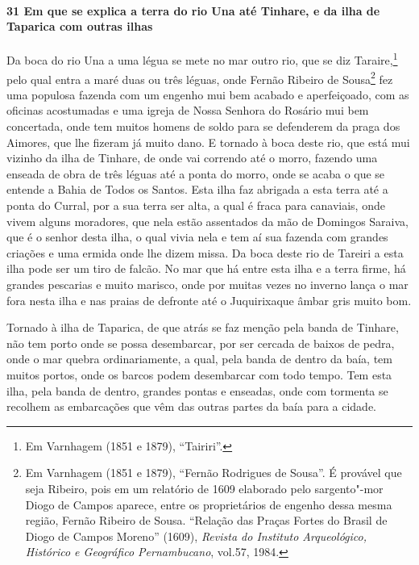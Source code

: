 \begin{linenumbers}
\paragraph{31 Em que se explica a terra do rio Una até Tinhare, e da ilha de Taparica com
outras ilhas}\quad
Da boca do rio Una a uma légua se mete no mar outro rio, que se diz Taraire,\footnote{ Em
Varnhagem (1851 e 1879), ``Tairiri''.} pelo qual entra a maré duas ou três léguas, onde
Fernão Ribeiro de Sousa\footnote{ Em Varnhagem (1851 e 1879), ``Fernão Rodrigues de
Sousa''. É provável que seja Ribeiro, pois em um relatório de 1609 elaborado pelo
sargento"-mor Diogo de Campos aparece, entre os proprietários de engenho dessa mesma
região, Fernão Ribeiro de Sousa. “Relação das Praças Fortes do Brasil de Diogo de Campos
Moreno” (1609), \textit{Revista do Instituto Arqueológico, Histórico e Geográfico
Pernambucano}, vol.57, 1984.} fez uma populosa fazenda com um engenho mui bem acabado e
aperfeiçoado, com as oficinas acostumadas e uma igreja de Nossa Senhora do Rosário mui bem
concertada, onde tem muitos homens de soldo para se defenderem da praga dos Aimores, que
lhe fizeram já muito dano. E tornado à boca deste rio, que
está mui vizinho da ilha de Tinhare, de onde vai correndo até o morro, fazendo uma enseada
de obra de três léguas até a ponta do morro, onde se acaba o que se entende a Bahia de
Todos os Santos. Esta ilha faz abrigada a esta terra até a ponta do Curral, por a sua
terra ser alta, a qual é fraca para canaviais, onde vivem alguns moradores, que nela estão
assentados da mão de Domingos Saraiva, que é o senhor desta ilha, o qual vivia nela e tem
aí sua fazenda com grandes criações e uma ermida onde lhe dizem missa. Da boca deste rio
de Tareiri a esta ilha pode ser um tiro de falcão. No mar que há entre esta ilha e a terra
firme, há grandes pescarias e muito marisco, onde por muitas vezes no inverno lança o mar
fora nesta ilha e nas praias de defronte até o Juquirixaque âmbar gris muito bom.

Tornado à ilha de Taparica, de que atrás se faz menção pela banda de Tinhare, não tem
porto onde se possa desembarcar, por ser cercada de baixos de pedra, onde o mar quebra
ordinariamente, a qual, pela banda de dentro da baía, tem muitos portos, onde os barcos
podem desembarcar com todo tempo. Tem esta ilha, pela banda de dentro, grandes pontas e
enseadas, onde com tormenta se recolhem as embarcações que vêm das outras partes da baía
para a cidade.


\end{linenumbers}
